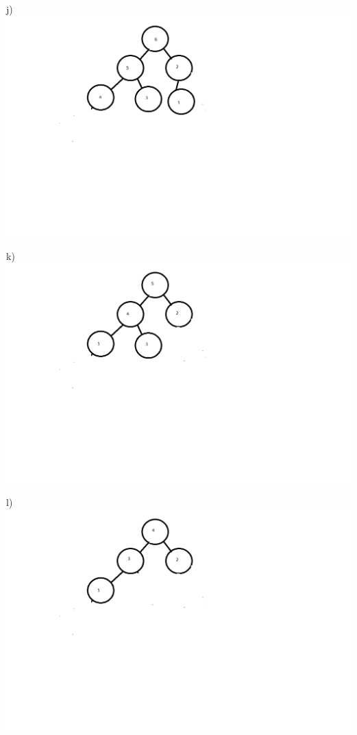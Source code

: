 \documentclass[12pt]{article} %
\begin{document}
j)\\
\includegraphics[scale = 0.5]{j.png}

k)\\
\includegraphics[scale = 0.5]{k.png}

l)\\
\includegraphics[scale = 0.5]{l.png}
\end{document}

